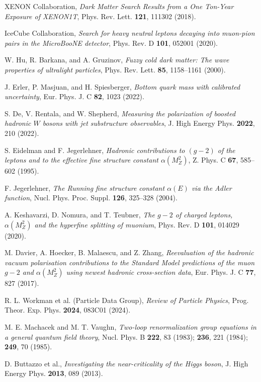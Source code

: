 \documentclass[%
amsmath,amssymb,
aps,
prb,
floatfix,showkeys
]{revtex4-2}
\begin{document}
\begin{thebibliography}{99}
XENON Collaboration, {\it Dark Matter Search Results from a One Ton-Year Exposure of XENON1T},
Phys. Rev. Lett. {\bf 121}, 111302 (2018).
  
IceCube Collaboration, {\it Search for heavy neutral leptons decaying into muon-pion pairs in the MicroBooNE detector},
Phys. Rev. D {\bf 101}, 052001 (2020).

W. Hu, R. Barkana, and A. Gruzinov,
{\it Fuzzy cold dark matter: The wave properties of ultralight particles},
Phys. Rev. Lett. {\bf 85}, 1158--1161 (2000).

J. Erler, P. Masjuan, and H. Spiesberger,
{\it Bottom quark mass with calibrated uncertainty},
Eur. Phys. J. C {\bf 82}, 1023 (2022).

S. De, V. Rentala, and W. Shepherd,
{\it Measuring the polarization of boosted hadronic $W$ bosons with jet substructure observables},
J. High Energy Phys. {\bf 2022}, 210 (2022).

S. Eidelman and F. Jegerlehner,
{\it Hadronic contributions to $(g-2)$ of the leptons and to the effective fine structure constant $\alpha(M_Z^2)$},
Z. Phys. C {\bf 67}, 585--602 (1995).

F. Jegerlehner,
{\it The Running fine structure constant $\alpha(E)$ via the Adler function},
Nucl. Phys. Proc. Suppl. {\bf 126}, 325--328 (2004).

A. Keshavarzi, D. Nomura, and T. Teubner,
{\it The $g-2$ of charged leptons, $\alpha(M_Z^2)$ and the hyperfine splitting of muonium},
Phys. Rev. D {\bf 101}, 014029 (2020).

M. Davier, A. Hoecker, B. Malaescu, and Z. Zhang,
{\it Reevaluation of the hadronic vacuum polarisation contributions to the Standard Model predictions of the muon $g-2$ and $\alpha(M_Z^2)$ using newest hadronic cross-section data},
Eur. Phys. J. C {\bf 77}, 827 (2017).

R. L. Workman et al. (Particle Data Group),
{\it Review of Particle Physics},
Prog. Theor. Exp. Phys. {\bf 2024}, 083C01 (2024).

M. E. Machacek and M. T. Vaughn,
{\it Two-loop renormalization group equations in a general quantum field theory},
Nucl. Phys. B {\bf 222}, 83 (1983); {\bf 236}, 221 (1984); {\bf 249}, 70 (1985).

D. Buttazzo et al.,
{\it Investigating the near-criticality of the Higgs boson},
J. High Energy Phys. {\bf 2013}, 089 (2013).


\end{thebibliography}
\end{document}
